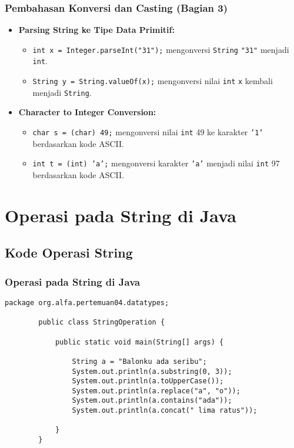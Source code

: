 \documentclass[aspectratio=169, table]{beamer}
\begin{document}
\begin{frame}
	\frametitle{Pembahasan Konversi dan Casting (Bagian 3)}
	\begin{itemize}
		\item \textbf{Parsing String ke Tipe Data Primitif:}
		\begin{itemize}
			\item \texttt{int x = Integer.parseInt("31");} mengonversi \texttt{String} \texttt{"31"} menjadi \texttt{int}.
			\item \texttt{String y = String.valueOf(x);} mengonversi nilai \texttt{int} \texttt{x} kembali menjadi \texttt{String}.
		\end{itemize}
		
		\item \textbf{Character to Integer Conversion:}
		\begin{itemize}
			\item \texttt{char s = (char) 49;} mengonversi nilai \texttt{int} 49 ke karakter \texttt{'1'} berdasarkan kode ASCII.
			\item \texttt{int t = (int) 'a';} mengonversi karakter \texttt{'a'} menjadi nilai \texttt{int} 97 berdasarkan kode ASCII.
		\end{itemize}
	\end{itemize}
\end{frame}


\section{Operasi pada String di Java}

\subsection{Kode Operasi String}
\begin{frame}[fragile]
	\vspace{15pt}
	\frametitle{Operasi pada String di Java}
	\begin{lstlisting}[style=JavaStyle]
		package org.alfa.pertemuan04.datatypes;
		
		public class StringOperation {
			
			public static void main(String[] args) {
				
				String a = "Balonku ada seribu";
				System.out.println(a.substring(0, 3));
				System.out.println(a.toUpperCase());
				System.out.println(a.replace("a", "o"));
				System.out.println(a.contains("ada"));
				System.out.println(a.concat(" lima ratus"));
				
			}
		}
	\end{lstlisting}
\end{frame}
\end{document}
